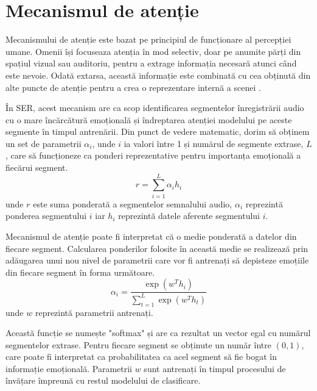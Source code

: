 \documentclass[a4paper,12pt]{book}
\begin{document}
				\section{Mecanismul de atenție} \label{attention}
				 Mecanismului de atenție este bazat  pe principiul de funcționare al percepției umane. Omenii  își focuseaza atenția în mod selectiv, doar pe anumite părți din spațiul vizual sau auditoriu, pentru a extrage informația necesară atunci când este nevoie. Odată extarsa, această informație este combinată cu cea obținută din alte puncte de atenție pentru a crea o reprezentare internă a scenei \cite{zhang, attention1}. \par
				 În SER, acest mecanism are ca scop identificarea segmentelor înregistrării audio cu o mare încărcătură emoțională și îndreptarea atenției modelului pe aceste segmente în timpul antrenării. Din punct de vedere matematic, dorim să obținem un set de parametrii $\alpha_i$, unde $i$ ia valori între 1 și numărul de segmente extrase, $L$, care să funcționeze ca ponderi reprezentative pentru importanța emoțională a fiecărui segment.
				\begin{equation}
					r = \sum_{i=1}^{L} \alpha_i h_i
				\end{equation}
				unde $r$ este suma ponderată a segmentelor semnalului audio, $\alpha_i$ reprezintă ponderea segmentului $i$ iar $h_i$ reprezintă datele aferente segmentului $i$. \par
				Mecanismul de atenție poate fi interpretat că o medie ponderată a datelor din fiecare segment. Calcularea ponderilor folosite în această medie se realizează prin adăugarea unui nou nivel de parametrii care vor fi antrenați să depisteze emoțiile din fiecare segment în forma următoare.
				\begin{equation} \label{softmax_form}
					\alpha_i = \frac{\exp(w^Th_i)}{\sum_{t=1}^{L} \exp(w^Th_t)}
				\end{equation}
				unde $w$ reprezintă parametrii antrenați. \par
				Această funcție se numește "softmax" și are ca rezultat un vector egal cu numărul segmentelor extrase. Pentru fiecare segment se obținute un număr între $(0, 1)$, care poate fi interpretat ca probabilitatea ca acel segment să fie bogat în informație emoțională.  Parametrii $w$ sunt antrenați în timpul procesului de învățare împreună cu restul modelului de clasificare.
			
\end{document}
